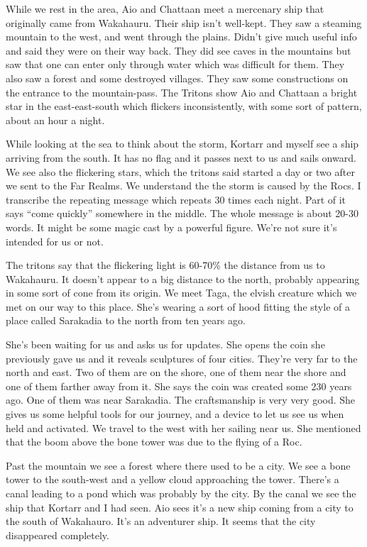 \documentclass[10pt,a4paper,twoside,openany,hidelinks]{book}
\begin{document}
While we rest in the area, Aio and Chattaan meet a mercenary ship that originally came from Wakahauru. Their ship isn't well-kept. They saw a steaming mountain to the west, and went through the plains. Didn't give much useful info and said they were on their way back.
They did see caves in the mountains but saw that one can enter only through water which was difficult for them. They also saw a forest and some destroyed villages. They saw some constructions on the entrance to the mountain-pass. The Tritons show Aio and Chattaan a bright star in the east-east-south which flickers inconsistently, with some sort of pattern, about an hour a night.

While looking at the sea to think about the storm, Kortarr and myself see a ship arriving from the south. It has no flag and it passes next to us and sails onward. We see also the flickering stars, which the tritons said started a day or two after we sent to the Far Realms. We understand the the storm is caused by the Rocs. I transcribe the repeating message which repeats 30 times each night. Part of it says ``come quickly'' somewhere in the middle. The whole message is about 20-30 words. It might be some magic cast by a powerful figure. We're not sure it's intended for us or not.

The tritons say that the flickering light is 60-70\% the distance from us to Wakahauru. It doesn't appear to a big distance to the north, probably appearing in some sort of cone from its origin.
We meet Taga, the elvish creature which we met on our way to this place. She's wearing a sort of hood fitting the style of a place called Sarakadia to the north from ten years ago.

She's been waiting for us and asks us for updates. She opens the coin she previously gave us and it reveals sculptures of four cities. They're very far to the north and east. Two of them are on the shore, one of them near the shore and one of them farther away from it. She says the coin was created some 230 years ago. One of them was near Sarakadia. The craftsmanship is very very good.
She gives us some helpful tools for our journey, and a device to let us see us when held and activated. We travel to the west with her sailing near us. She mentioned that the boom above the bone tower was due to the flying of a Roc.

Past the mountain we see a forest where there used to be a city. We see a bone tower to the south-west and a yellow cloud approaching the tower.
There's a canal leading to a pond which was probably by the city.
By the canal we see the ship that Kortarr and I had seen. Aio sees it's a new ship coming from a city to the south of Wakahauro. It's an adventurer ship. It seems that the city disappeared completely.
\end{document}
